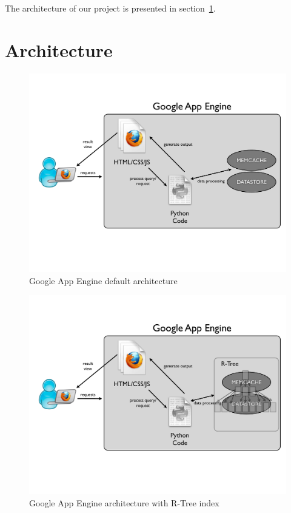 \documentclass{scrartcl}
\begin{document}
The architecture of our project is presented in section~\ref{sec:architecture}. 

\section{Architecture}
\label{sec:architecture}
\begin{figure}[h]
\begin{center}
\includegraphics[scale=0.3]{fig/gapps1}
\caption{Google App Engine default architecture}
\label{fig:gappsArch}
\end{center}
\end{figure}

\begin{figure}[h]
\begin{center}
\includegraphics[scale=0.3]{fig/gapps2}
\caption{Google App Engine architecture with R-Tree index}
\label{fig:gappsArch2}
\end{center}
\end{figure}
\end{document}

